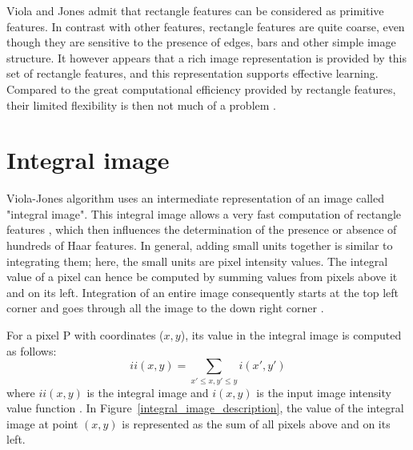 \noindent Viola and Jones admit that rectangle features can be considered as primitive features. In contrast with other features, rectangle features are quite coarse, even though they are sensitive to the presence of edges, bars and other simple image structure. It however appears that a rich image representation is provided by this set of rectangle features, and this representation supports effective learning. Compared to the great computational efficiency provided by rectangle features, their limited flexibility is then not much of a problem \cite{VIO01}.
\newline

\section{Integral image}

\vspace{\baselineskip}
\noindent Viola-Jones algorithm uses an intermediate representation of an image called "integral image". This integral image allows a very fast computation of rectangle features \cite{VIO01}, which then influences the determination of the presence or absence of hundreds of Haar features. In general, adding small units together is similar to integrating them; here, the small units are pixel intensity values. The integral value of a pixel can hence be computed by summing values from pixels above it and on its left. Integration of an entire image consequently starts at the top left corner and goes through all the image to the down right corner \cite{HEW07}.
\newline

\noindent For a pixel P with coordinates ($x,y$), its value in the integral image is computed as follows: \[ ii(x,y) = \sum_{x' \leq x,y' \leq y} i(x',y') \] where $ ii(x,y) $ is the integral image and $ i(x,y) $ is the input image intensity value function \cite{VIO01}. In Figure~\ref{integral_image_description}, the value of the integral image at point $ (x,y) $ is represented as the sum of all pixels above and on its left. 
\newline
	
